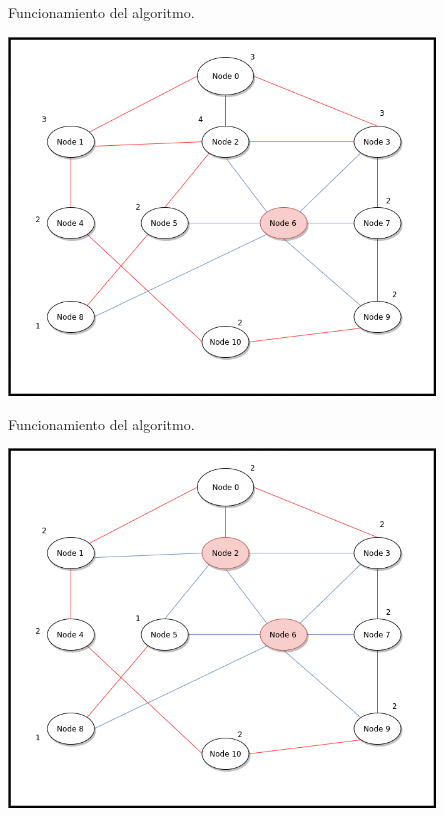 \documentclass[10pt]{beamer}
\begin{document}
\begin{frame}{Funcionamiento del algoritmo.}{}
	\begin{block}{}
		\includegraphics[width=0.85\textwidth]{gif-2.png}
	\end{block}
\end{frame}
\begin{frame}{Funcionamiento del algoritmo.}{}
	\begin{block}{}
		\includegraphics[width=0.85\textwidth]{gif-3.png}
	\end{block}
\end{frame}
\end{document}
